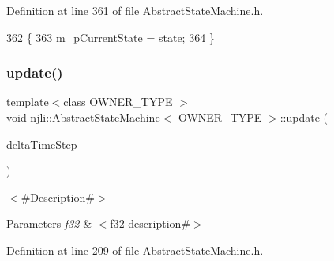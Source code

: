 Definition at line 361 of file Abstract\+State\+Machine.\+h.


\begin{DoxyCode}
362   \{
363     \mbox{\hyperlink{classnjli_1_1_abstract_state_machine_ae82332bd955b01fa48471ec0613e8207}{m\_pCurrentState}} = state;
364   \}
\end{DoxyCode}
\mbox{\label{classnjli_1_1_abstract_state_machine_af975fdfd08f9f6d93d739b12d1a06e52}} 
\subsubsection{\texorpdfstring{update()}{update()}}
{\footnotesize\ttfamily template$<$class O\+W\+N\+E\+R\+\_\+\+T\+Y\+PE $>$ \\
\mbox{\hyperlink{_thread_8h_af1e856da2e658414cb2456cb6f7ebc66}{void}} \mbox{\hyperlink{classnjli_1_1_abstract_state_machine}{njli\+::\+Abstract\+State\+Machine}}$<$ O\+W\+N\+E\+R\+\_\+\+T\+Y\+PE $>$\+::update (\begin{DoxyParamCaption}\item[{\mbox{\hyperlink{_util_8h_a5f6906312a689f27d70e9d086649d3fd}{f32}}}]{delta\+Time\+Step }\end{DoxyParamCaption})}

$<$\#\+Description\#$>$


\begin{DoxyParams}{Parameters}
{\em f32} & $<$\mbox{\hyperlink{_util_8h_a5f6906312a689f27d70e9d086649d3fd}{f32}} description\#$>$ \\
\hline
\end{DoxyParams}


Definition at line 209 of file Abstract\+State\+Machine.\+h.


